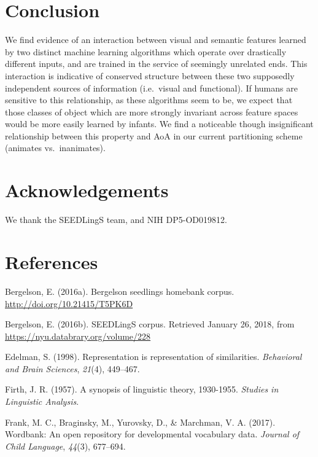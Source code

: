 \documentclass[10pt, letterpaper]{article}
\begin{document}
\section{Conclusion}\label{conclusion}

We find evidence of an interaction between visual and semantic features
learned by two distinct machine learning algorithms which operate over
drastically different inputs, and are trained in the service of
seemingly unrelated ends. This interaction is indicative of conserved
structure between these two supposedly independent sources of
information (i.e.~visual and functional). If humans are sensitive to
this relationship, as these algorithms seem to be, we expect that those
classes of object which are more strongly invariant across feature
spaces would be more easily learned by infants. We find a noticeable
though insignificant relationship between this property and AoA in our
current partitioning scheme (animates vs.~inanimates).

\section{Acknowledgements}\label{acknowledgements}

We thank the SEEDLingS team, and NIH DP5-OD019812.

\section{References}\label{references}

\setlength{\parindent}{-0.1in} \setlength{\leftskip}{0.125in} \noindent

\hypertarget{refs}{}
\hypertarget{ref-bergelson2016seedlings}{}
Bergelson, E. (2016a). Bergelson seedlings homebank corpus.
\url{http://doi.org/10.21415/T5PK6D}

\hypertarget{ref-bergelson2016seedlingsdatabrary}{}
Bergelson, E. (2016b). SEEDLingS corpus. Retrieved January 26, 2018,
from \url{https://nyu.databrary.org/volume/228}

\hypertarget{ref-edelman1998representation}{}
Edelman, S. (1998). Representation is representation of similarities.
\emph{Behavioral and Brain Sciences}, \emph{21}(4), 449--467.

\hypertarget{ref-firth1957synopsis}{}
Firth, J. R. (1957). A synopsis of linguistic theory, 1930-1955.
\emph{Studies in Linguistic Analysis}.

\hypertarget{ref-frank2017wordbank}{}
Frank, M. C., Braginsky, M., Yurovsky, D., \& Marchman, V. A. (2017).
Wordbank: An open repository for developmental vocabulary data.
\emph{Journal of Child Language}, \emph{44}(3), 677--694.
\end{document}
